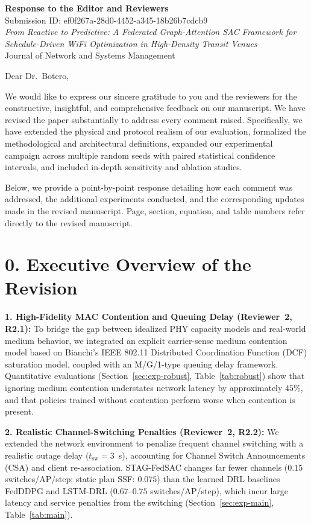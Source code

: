 \documentclass[11pt,a4paper]{article}
\begin{document}
\begin{center}
{\Large\bfseries Response to the Editor and Reviewers}\\[0.4em]
Submission ID: ef0f267a-28d0-4452-a345-18b26b7cdcb9\\
\emph{From Reactive to Predictive: A Federated Graph-Attention SAC Framework for Schedule-Driven WiFi Optimization in High-Density Transit Venues}\\
Journal of Network and Systems Management
\end{center}

Dear Dr.\ Botero,

We would like to express our sincere gratitude to you and the reviewers for the constructive, insightful, and comprehensive feedback on our manuscript. We have revised the paper substantially to address every comment raised. Specifically, we have extended the physical and protocol realism of our evaluation, formalized the methodological and architectural definitions, expanded our experimental campaign across multiple random seeds with paired statistical confidence intervals, and included in-depth sensitivity and ablation studies.

Below, we provide a point-by-point response detailing how each comment was addressed, the additional experiments conducted, and the corresponding updates made in the revised manuscript. Page, section, equation, and table numbers refer directly to the revised manuscript.

\section*{0. Executive Overview of the Revision}

\textbf{1. High-Fidelity MAC Contention and Queuing Delay (Reviewer~2, R2.1):} 
To bridge the gap between idealized PHY capacity models and real-world medium behavior, we integrated an explicit carrier-sense medium contention model based on Bianchi's IEEE 802.11 Distributed Coordination Function (DCF) saturation model, coupled with an M/G/1-type queuing delay framework. Quantitative evaluations (Section~\ref{sec:exp-robust}, Table~\ref{tab:robust}) show that ignoring medium contention understates network latency by approximately $45\%$, and that policies trained without contention perform worse when contention is present.

\textbf{2. Realistic Channel-Switching Penalties (Reviewer~2, R2.2):} 
We extended the network environment to penalize frequent channel switching with a realistic outage delay ($t_{\mathrm{sw}}=3$~s), accounting for Channel Switch Announcements (CSA) and client re-association. STAG-FedSAC changes far fewer channels ($0.15$ switches/AP/step; static plan SSF: $0.075$) than the learned DRL baselines FedDDPG and LSTM-DRL ($0.67$--$0.75$ switches/AP/step), which incur large latency and service penalties from the switching (Section~\ref{sec:exp-main}, Table~\ref{tab:main}).
\end{document}
